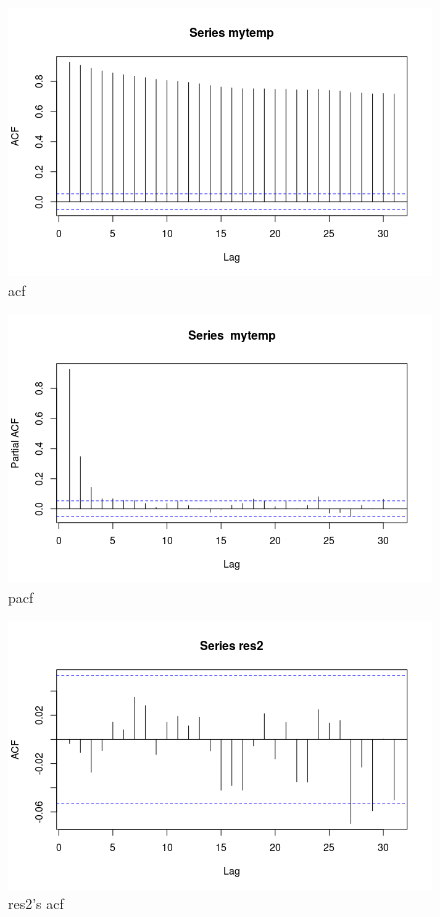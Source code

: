\documentclass[a4paper,10pt]{article}
\begin{document}
\begin{figure}[H]
\centering
\caption{acf}
\includegraphics[scale=.70]{mytemp_acf.png}
\end{figure}

\begin{figure}[H]
\centering
\caption{pacf}
\includegraphics[scale=.70]{mytemp_pacf.png}
\end{figure}


\begin{figure}[H]
\centering
\caption{res2's acf}
\includegraphics[scale=.70]{res2_acf.png}
\end{figure}
\end{document}
